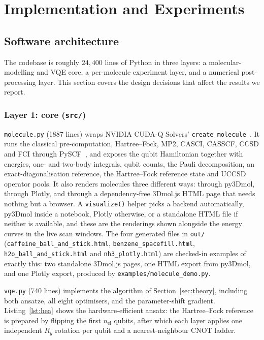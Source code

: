 \documentclass[sigconf,screen,nonacm]{acmart}
\makeatletter
\newcommand{\@resetcolroom}{%
  \ifdim\pagetotal=\z@
    \ifx\@toplist\@empty\ifx\@botlist\@empty\ifx\@midlist\@empty
      \global\@colroom\@colht
      \global\vsize\@colht
    \fi\fi\fi
  \fi}
\let\@origFloatBarrier\FloatBarrier
\renewcommand{\FloatBarrier}{\@origFloatBarrier\@resetcolroom}
\makeatother
\begin{document}
\FloatBarrier
\section{Implementation and Experiments}
\label{sec:impl}

\subsection{Software architecture}
\label{sec:software}

The codebase is roughly $24{,}400$ lines of Python in three layers: a
molecular-modelling and VQE core, a per-molecule experiment layer, and a
numerical post-processing layer. This section covers the design decisions
that affect the results we report.

\subsubsection{Layer 1: core (\texttt{src/})}

\texttt{molecule.py} (1887 lines) wraps NVIDIA CUDA-Q Solvers'
\texttt{create\_molecule}~\cite{cudaq}. It runs the classical
pre-computation, Hartree--Fock, MP2, CASCI, CASSCF, CCSD and FCI through
PySCF~\cite{pyscf}, and exposes the qubit Hamiltonian together with
energies, one- and two-body integrals, qubit counts, the Pauli decomposition,
an exact-diagonalisation reference, the Hartree--Fock reference state and
UCCSD operator pools. It also renders molecules three different ways: through
py3Dmol, through Plotly, and through a dependency-free 3Dmol.js HTML page
that needs nothing but a browser. A \texttt{visualize()} helper picks a
backend automatically, py3Dmol inside a notebook, Plotly otherwise, or a
standalone HTML file if neither is available, and these are the renderings
shown alongside the energy curves in the live scan windows. The four
generated files in \texttt{out/} (\texttt{caffeine\_ball\_and\_stick.html},
\texttt{benzene\_spacefill.html}, \texttt{h2o\_ball\_and\_stick.html} and
\texttt{nh3\_plotly.html}) are checked-in examples of exactly this: two
standalone 3Dmol.js pages, one HTML export from py3Dmol, and one Plotly
export, produced by \texttt{examples/molecule\_demo.py}.

\texttt{vqe.py} (740 lines) implements the algorithm of
Section~\ref{sec:theory}, including both ansatze, all eight optimisers, and
the parameter-shift gradient. Listing~\ref{lst:hea} shows the
hardware-efficient ansatz: the Hartree--Fock reference is prepared by
flipping the first $n_{\text{el}}$ qubits, after which each layer applies one
independent $R_y$ rotation per qubit and a nearest-neighbour CNOT ladder.
\end{document}
